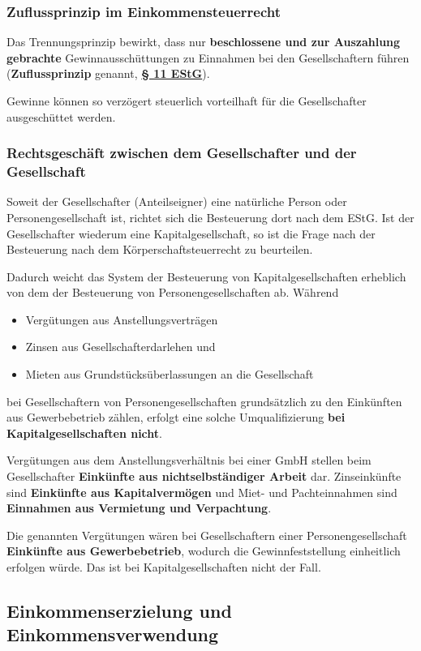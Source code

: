 \documentclass[12pt,A4]{extarticle}
\newcommand{\highlight}[1]{\textcolor{highlightColor}{\textbf{#1}}}
\newcommand{\estG}[2][]{\textbf{\textcolor{gesetzLink}{\href{https://www.gesetze-im-internet.de/estg/__#2.html}{§ #2 \ifthenelse{\equal{#1}{}}{}{#1 }EStG}}}}
\begin{document}
\subsubsection{Zuflussprinzip im Einkommensteuerrecht}
Das Trennungsprinzip bewirkt, dass nur \textbf{beschlossene und zur Auszahlung gebrachte} Gewinnausschüttungen zu Einnahmen bei den Gesellschaftern führen (\highlight{Zuflussprinzip} genannt, \estG{11}).\par
Gewinne können so verzögert steuerlich vorteilhaft für die Gesellschafter ausgeschüttet werden.

\subsubsection{Rechtsgeschäft zwischen dem Gesellschafter und der Gesellschaft}
Soweit der Gesellschafter (Anteilseigner) eine natürliche Person oder Personengesellschaft ist, richtet sich die Besteuerung dort nach dem EStG. Ist der Gesellschafter wiederum eine Kapitalgesellschaft, so ist die Frage nach der Besteuerung nach dem Körperschaftsteuerrecht zu beurteilen.\par
Dadurch weicht das System der Besteuerung von Kapitalgesellschaften erheblich von dem der Besteuerung von Personengesellschaften ab. Während
\begin{itemize}
  \item{Vergütungen aus Anstellungsverträgen}
  \item{Zinsen aus Gesellschafterdarlehen und}
  \item{Mieten aus Grundstücksüberlassungen an die Gesellschaft}
\end{itemize}
bei Gesellschaftern von Personengesellschaften grundsätzlich zu den Einkünften aus Gewerbebetrieb zählen, erfolgt eine solche Umqualifizierung \textbf{bei Kapitalgesellschaften nicht}.\par
Vergütungen aus dem Anstellungsverhältnis bei einer GmbH stellen beim Gesellschafter \textbf{Einkünfte aus nichtselbständiger Arbeit} dar. Zinseinkünfte sind \textbf{Einkünfte aus Kapitalvermögen} und Miet- und Pachteinnahmen sind \textbf{Einnahmen aus Vermietung und Verpachtung}.\par
Die genannten Vergütungen wären bei Gesellschaftern einer Personengesellschaft \textbf{Einkünfte aus Gewerbebetrieb}, wodurch die Gewinnfeststellung einheitlich erfolgen würde. Das ist bei Kapitalgesellschaften nicht der Fall.\par

\subsection{Einkommenserzielung und Einkommensverwendung}
\end{document}
